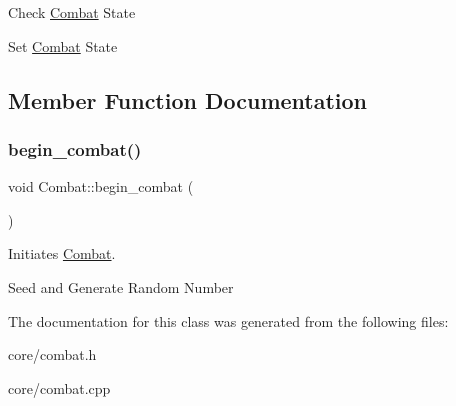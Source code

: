 Check \mbox{\hyperlink{classCombat}{Combat}} State

Set \mbox{\hyperlink{classCombat}{Combat}} State 

\subsection{Member Function Documentation}
\mbox{\label{classCombat_a466fcd2a5dd79b9288bdfc75fdfff870}} 
\subsubsection{\texorpdfstring{begin\+\_\+combat()}{begin\_combat()}}
{\footnotesize\ttfamily void Combat\+::begin\+\_\+combat (\begin{DoxyParamCaption}{ }\end{DoxyParamCaption})}



Initiates \mbox{\hyperlink{classCombat}{Combat}}. 

Seed and Generate Random Number 

The documentation for this class was generated from the following files\+:\begin{DoxyCompactItemize}
\item 
core/combat.\+h\item 
core/combat.\+cpp\end{DoxyCompactItemize}
